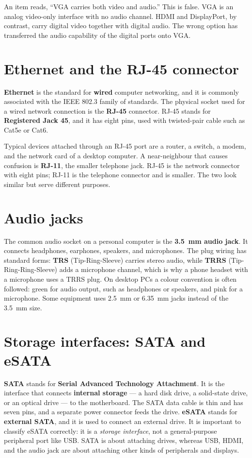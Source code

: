 \begin{example}
An item reads, ``VGA carries both video and audio.'' This is false. VGA is an
analog video-only interface with no audio channel. HDMI and DisplayPort, by
contrast, carry digital video together with digital audio. The wrong option
has transferred the audio capability of the digital ports onto VGA.
\end{example}

\section{Ethernet and the RJ-45 connector}
\textbf{Ethernet} is the standard for \textbf{wired} computer networking, and
it is commonly associated with the IEEE 802.3 family of standards. The
physical socket used for a wired network connection is the \textbf{RJ-45}
connector. RJ-45 stands for \textbf{Registered Jack 45}, and it has eight
pins, used with twisted-pair cable such as Cat5e or Cat6.

Typical devices attached through an RJ-45 port are a router, a switch, a
modem, and the network card of a desktop computer. A near-neighbour that
causes confusion is \textbf{RJ-11}, the smaller telephone jack. RJ-45 is the
network connector with eight pins; RJ-11 is the telephone connector and is
smaller. The two look similar but serve different purposes.

\section{Audio jacks}
The common audio socket on a personal computer is the \textbf{3.5~mm audio
jack}. It connects headphones, earphones, speakers, and microphones. The plug
wiring has standard forms: \textbf{TRS} (Tip-Ring-Sleeve) carries stereo
audio, while \textbf{TRRS} (Tip-Ring-Ring-Sleeve) adds a microphone channel,
which is why a phone headset with a microphone uses a TRRS plug. On desktop
PCs a colour convention is often followed: green for audio output, such as
headphones or speakers, and pink for a microphone. Some equipment uses
2.5~mm or 6.35~mm jacks instead of the 3.5~mm size.

\section{Storage interfaces: SATA and eSATA}
\textbf{SATA} stands for \textbf{Serial Advanced Technology Attachment}. It
is the interface that connects \textbf{internal storage} --- a hard disk
drive, a solid-state drive, or an optical drive --- to the motherboard. The
SATA data cable is thin and has seven pins, and a separate power connector
feeds the drive. \textbf{eSATA} stands for \textbf{external SATA}, and it is
used to connect an external drive. It is important to classify eSATA
correctly: it is a \emph{storage interface}, not a general-purpose peripheral
port like USB. SATA is about attaching drives, whereas USB, HDMI, and the
audio jack are about attaching other kinds of peripherals and displays.

